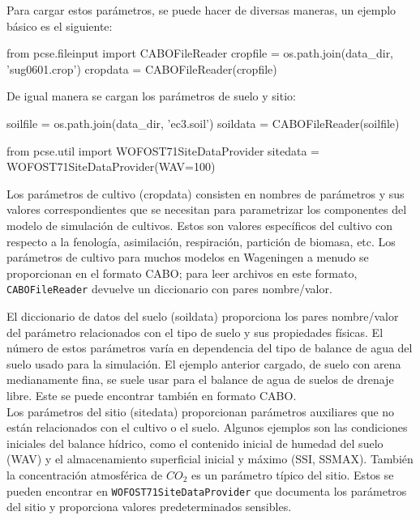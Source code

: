 Para cargar estos parámetros, se puede hacer de diversas maneras, un ejemplo básico es el siguiente:

\begin{python}
	from pcse.fileinput import CABOFileReader
	cropfile = os.path.join(data_dir, 'sug0601.crop')
	cropdata = CABOFileReader(cropfile)
\end{python}

De igual manera se cargan los parámetros de suelo y sitio:

\begin{python}
	soilfile = os.path.join(data_dir, 'ec3.soil')
	soildata = CABOFileReader(soilfile)
	
	from pcse.util import WOFOST71SiteDataProvider
	sitedata = WOFOST71SiteDataProvider(WAV=100)
\end{python} 

Los parámetros de cultivo (cropdata) consisten en nombres de parámetros y sus valores correspondientes que se necesitan para parametrizar los componentes del modelo de simulación de cultivos. Estos son valores específicos del cultivo con respecto a la fenología, asimilación, respiración, partición de biomasa, etc.
Los parámetros de cultivo para muchos modelos en Wageningen a menudo se proporcionan en el formato CABO; para leer archivos en este formato, \lstinline|CABOFileReader| devuelve un diccionario con pares nombre/valor.

El diccionario de datos del suelo (soildata) proporciona los pares nombre/valor del parámetro relacionados con el tipo de suelo y sus propiedades físicas. El número de estos parámetros varía en dependencia del tipo de balance de agua del suelo usado para la simulación. El ejemplo anterior cargado, de suelo con arena medianamente fina, se suele usar para el balance de agua de suelos de drenaje libre. Este se puede encontrar también en formato CABO.\\

Los parámetros del sitio (sitedata) proporcionan parámetros auxiliares que no están relacionados con el cultivo o el suelo. Algunos ejemplos son las condiciones iniciales del balance hídrico, como el contenido inicial de humedad del suelo (WAV) y el almacenamiento superficial inicial y máximo (SSI, SSMAX). También la concentración atmosférica de $ CO_2 $ es un parámetro típico del sitio. Estos se pueden encontrar en \lstinline|WOFOST71SiteDataProvider| que documenta los parámetros del sitio y proporciona valores predeterminados sensibles.\\


